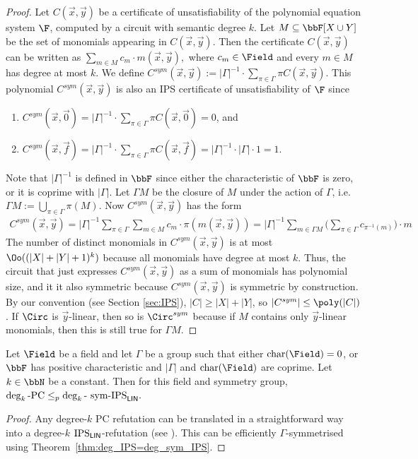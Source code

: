 \documentclass[a4paper,UKenglish,cleveref, autoref, thm-restate]{lipics-v2021}
\newcommand{\IPSlin}{\text{\upshape IPS}_{\mathsf{LIN}}}
\newcommand{\symIPSlin}{\text{ \upshape sym-IPS}_{\mathsf{LIN}}}
\begin{document}
\begin{proof}
	Let $C(\vec x,\vec y)$ be a certificate of unsatisfiability of the polynomial equation system $\F$, computed by a circuit with semantic degree $k$. Let $M \subseteq \bbF[X \cup Y]$ be the set of monomials appearing in $C(\vec x,\vec y)$.
	Then the certificate $C(\vec x, \vec y)$ can be written as
	$
	\sum_{m \in M}c_m \cdot m(\vec x, \vec y),
	$
	where $c_m \in \Field$ and every $m \in M$ has degree at most $k$.
	We define
	$
	C^{sym}(\vec x, \vec y) := |\Gamma|^{-1} \cdot \sum_{\pi \in \Gamma}\pi C(\vec x, \vec y).
	$
	This polynomial $C^{sym}(\vec x, \vec y)$ is also an IPS certificate of unsatisfiability 
	of $\F$ since  
	\begin{enumerate}[label=(\arabic*)]
		\item $C^{sym}(\vec x, \vec 0) = 
		|\Gamma|^{-1} \cdot \sum_{\pi \in \Gamma} \pi C(\vec x, \vec 0) = 0$, and
		\item $C^{sym}(\vec x, \vec f) = 
		|\Gamma|^{-1} \cdot \sum_{\pi \in \Gamma} \pi C(\vec x, \vec f) = |\Gamma|^{-1} \cdot |\Gamma| \cdot 1 = 1$. 
	\end{enumerate}
	Note that $|\Gamma|^{-1}$ is defined in $\bbF$ since either the characteristic of $\bbF$ is zero, or it is coprime with $|\Gamma|$.  
	Let $\Gamma M$ be the closure of $M$ under the action of $\Gamma$, i.e.
	$
	\Gamma M := \bigcup_{\pi \in \Gamma} \pi(M).   
	$
	Now $C^{sym}(\vec x, \vec y)$ has the form 
	\begin{align*}
		C^{sym}(\vec x, \vec y) = 
		|\Gamma|^{-1} \sum_{\pi \in \Gamma}  \sum_{m \in M} c_m \cdot \pi(m(\vec x, \vec y)) 
		= |\Gamma|^{-1} \sum_{m \in \Gamma M} \Big( \sum_{\pi \in \Gamma} c_{\pi^{-1}(m)}  \Big) \cdot m
	\end{align*}
	The number of distinct monomials in $C^{sym}(\vec x, \vec y)$ is at most $\Oo((|X|+|Y|+1)^{k})$ because all monomials have degree at most $k$. 
	Thus, the circuit that just expresses $C^{sym}(\vec x, \vec y)$ as a sum of monomials has polynomial size, and it it also symmetric because $C^{sym}(\vec x, \vec y)$ is symmetric by construction.
	By our convention (see Section \ref{sec:IPS}), $|C| \geq |X|+|Y|$, so $|C^{sym}| \leq \poly(|C|)$. If $\Circ$ is $\vec{y}$-linear, then so is $\Circ^{sym}$ because if $M$ contains only $\vec y$-linear monomials, then this is still true for $\Gamma M$.
\end{proof}


\begin{corollary}
	\label{cor:boundedDegPC<=symIPS}
	Let $\Field$ be a field and let $\Gamma$ be a group
	such that either $\mathrm{char}(\Field) = 0$, or $\bbF$ has positive characteristic and $|\Gamma|$ and $\mathrm{char}(\Field)$ are coprime. Let $k \in \bbN$ be a constant. Then for this field and symmetry group,
	$
	\deg_k\text{-}\mathrm{PC} \leq_p \deg_k\text{-}\symIPSlin.
	$
\end{corollary}	
\begin{proof}
	Any degree-$k$ PC refutation can be translated in a straightforward way into a degree-$k$ $\IPSlin$-refutation (see \cite[Proposition 3.4]{IPS}). This can be efficiently $\Gamma$-symmetrised using Theorem~\ref{thm:deg_IPS=deg_sym_IPS}.
\end{proof}	
\end{document}
